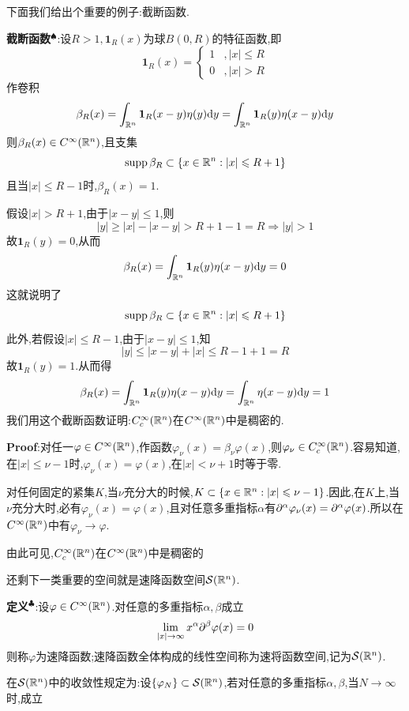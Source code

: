 下面我们给出个重要的例子:截断函数.\par
\textbf{截断函数}$^\spadesuit$:设$R>1,\mathbf{1}_{R}(x)$为球$B(0,R)$的特征函数,即
$$
\mathbf{1}_{R}(x)=
\begin{cases}
    1&,|x|\leqslant R\\
    0&,|x|>R
\end{cases}
$$
作卷积
$$
\beta_{R}(x)=\int_{\mathbb{R}^n}\mathbf{1}_{R}(x-y)\eta (y)\mathrm{d} y=\int_{\mathbb{R}^n}\mathbf{1}_{R}(y)\eta (x-y)\mathrm{d} y
$$
则$\beta_{R}(x)\in C^{\infty}(\mathbb{R}^n)$,且支集
$$
\operatorname{supp} \beta_{R}\subset\{x\in\mathbb{R}^n:|x|\leqslant R+1\}
$$
且当$|x|\leqslant R-1$时,$\beta_{R}(x)=1$.\par
假设$|x|>R+1$,由于$|x-y|\leqslant 1$,则
$$
|y|\geqslant |x|-|x-y|>R+1-1=R \Rightarrow |y|>1
$$
故$\mathbf{1}_{R}(y)=0$,从而
$$
\beta_{R}(x)=\int_{\mathbb{R}^n}\mathbf{1}_{R}(y)\eta (x-y)\mathrm{d} y=0
$$
这就说明了
$$
\operatorname{supp} \beta_{R}\subset\{x\in\mathbb{R}^n:|x|\leqslant R+1\}
$$
此外,若假设$|x|\leqslant R-1$,由于$|x-y|\leqslant 1$,知
$$
|y|\leqslant |x-y|+|x|\leqslant R-1+1=R
$$
故$\mathbf{1}_{R}(y)=1$.从而得
$$
\beta_{R}(x)=\int_{\mathbb{R}^n}\mathbf{1}_{R}(y)\eta (x-y)\mathrm{d} y=\int_{\mathbb{R}^n}\eta (x-y)\mathrm{d} y=1
$$
\qquad 我们用这个截断函数证明:$C^{\infty}_c(\mathbb{R}^n)$在$C^{\infty}(\mathbb{R}^n)$中是稠密的.\par
\textbf{Proof}:对任一$\varphi\in C^{\infty}(\mathbb{R}^n)$,作函数$\varphi _\nu(x)=\beta_{\nu}\varphi (x)$,则$\varphi_\nu\in C^{\infty}_c(\mathbb{R}^n)$.容易知道,在$|x|\leqslant\nu-1$时,$\varphi_\nu(x)=\varphi (x)$,在$|x|<\nu+1$时等于零.\par
对任何固定的紧集$K$,当$\nu$充分大的时候,$K\subset\{x\in\mathbb{R}^n:|x|\leqslant\nu-1\}$.因此,在$K$上,当$\nu$充分大时,必有$\varphi_\nu(x)=\varphi(x)$,且对任意多重指标$\alpha$有$\partial ^{\alpha}\varphi_\nu(x)=\partial ^{\alpha}\varphi(x)$.所以在$C^{\infty}(\mathbb{R}^n)$中有$\varphi_\nu\to\varphi$.\par
由此可见,$C^{\infty}_c(\mathbb{R}^n)$在$C^{\infty}(\mathbb{R}^n)$中是稠密的\par
还剩下一类重要的空间就是速降函数空间$\mathcal{S}(\mathbb{R} ^n)$.\par
\textbf{定义}$^\clubsuit $:设$\varphi\in C^{\infty}(\mathbb{R} ^n)$.对任意的多重指标$\alpha,\beta$成立
\begin{equation}
    \lim_{|x|\to \infty}x^{\alpha}\partial^{\beta}\varphi (x)=0
    \label{eq:2.1.8}
\end{equation}
则称$\varphi$为速降函数;速降函数全体构成的线性空间称为速将函数空间,记为$\mathcal{S}(\mathbb{R} ^n)$.\par
在$\mathcal{S}(\mathbb{R} ^n)$中的收敛性规定为:设$\{\varphi _N\}\subset\mathcal{S}(\mathbb{R} ^n)$,若对任意的多重指标$\alpha,\beta$,当$N\to\infty$时,成立
